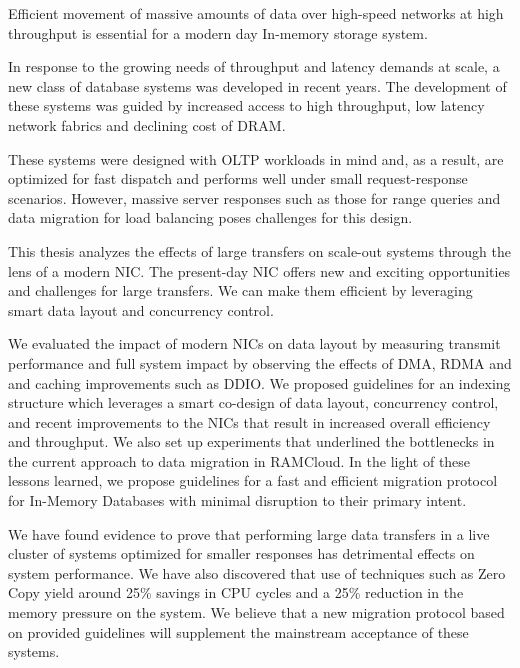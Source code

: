 


Efficient movement of massive amounts of data over high-speed networks at high 
throughput is essential for a modern day In-memory storage system.

In response to the growing needs of throughput and latency demands at scale, a new class of database systems was developed in recent years.
The development of these systems was guided by increased access to high throughput, low latency network fabrics and declining cost of DRAM.

These systems were designed with OLTP workloads in mind and, as a result, are optimized for fast dispatch and performs well under small
request-response scenarios. However, massive server responses such as those for range queries and data migration for load balancing poses challenges for this design.  

This thesis analyzes the effects of large transfers on scale-out systems through the lens of a modern NIC.
The present-day NIC offers new and exciting opportunities and challenges for large transfers.
We can make them efficient by leveraging smart data layout and concurrency control.

We evaluated the impact of modern NICs on data layout by measuring transmit performance and full system impact by observing the effects of DMA, RDMA and and caching improvements such as DDIO. 
We proposed guidelines for an indexing structure which leverages a smart co-design of data layout, concurrency control, and recent improvements to the NICs that result in increased overall efficiency and throughput. 
We also set up experiments that underlined the bottlenecks in the current approach to data migration in RAMCloud.
In the light of these lessons learned, we propose guidelines for a fast and efficient migration protocol for In-Memory Databases with minimal disruption to their primary intent.

We have found evidence to prove that performing large data transfers in a live cluster of systems optimized for smaller responses has detrimental effects on system performance. 
We have also discovered that use of techniques such as Zero Copy yield around 25\% savings in CPU cycles and a 25\% reduction in the memory pressure on the system. 
We believe that a new migration protocol based on provided guidelines will supplement the mainstream acceptance of these systems.